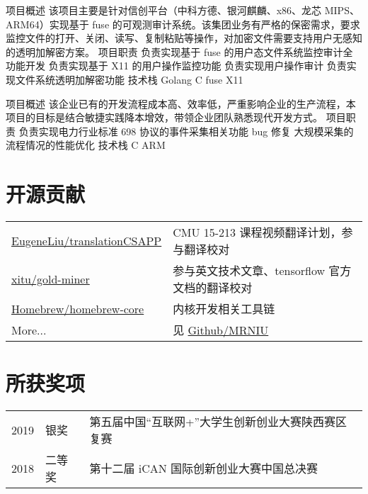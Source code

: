 \documentclass[]{deedy-resume-openfont}
\begin{document}
\begin{minipage}[t]{0.73\textwidth}
\begin{tightemize}
    项目概述
    该项目主要是针对信创平台（中科方德、银河麒麟、x86、龙芯 MIPS、ARM64）实现基于 fuse 的可观测审计系统。该集团业务有严格的保密需求，要求监控文件的打开、关闭、读写、复制粘贴等操作，对加密文件需要支持用户无感知的透明加解密方案。
    项目职责
    负责实现基于 fuse 的用户态文件系统监控审计全功能开发
    负责实现基于 X11 的用户操作监控功能
    负责实现用户操作审计
    负责实现文件系统透明加解密功能
    技术栈
    Golang
    C
    fuse
    X11
\end{tightemize}
\sectionsep


\begin{tightemize}
    项目概述
    该企业已有的开发流程成本高、效率低，严重影响企业的生产流程，本项目的目标是结合敏捷实践降本增效，带领企业团队熟悉现代开发方式。
    项目职责
    负责实现电力行业标准 698 协议的事件采集相关功能
    bug 修复
    大规模采集的流程情况的性能优化
    技术栈
    C
    ARM
\end{tightemize}
\sectionsep


\section{开源贡献}
\begin{tabular}{ll}
    \href{https://github.com/EugeneLiu/translationCSAPP}{EugeneLiu/translationCSAPP} & CMU 15-213 课程视频翻译计划，参与翻译校对 \\
    \href{https://github.com/xitu/gold-miner}{xitu/gold-miner} & 参与英文技术文章、tensorflow 官方文档的翻译校对 \\
    \href{https://github.com/Homebrew/homebrew-core}{Homebrew/homebrew-core} & 内核开发相关工具链 \\
    More... & 见 \href{https://github.com/MRNIU}{Github/MRNIU}
\end{tabular}
\sectionsep


\section{所获奖项} 
\begin{tabular}{rll}
    2019         & 银奖    & 第五届中国“互联网+”大学生创新创业大赛陕西赛区复赛 \\
    2018	     & 二等奖  & 第十二届 iCAN 国际创新创业大赛中国总决赛 \\
\end{tabular}
\sectionsep


\end{minipage}
\end{document}
